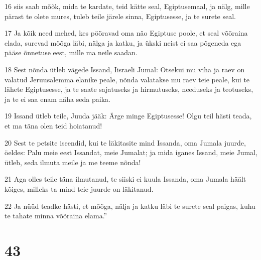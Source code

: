 \par 16 siis saab mõõk, mida te kardate, teid kätte seal, Egiptusemaal, ja nälg, mille pärast te olete mures, tuleb teile järele sinna, Egiptusesse, ja te surete seal.
\par 17 Ja kõik need mehed, kes pööravad oma näo Egiptuse poole, et seal võõraina elada, surevad mõõga läbi, nälga ja katku, ja ükski neist ei saa põgeneda ega pääse õnnetuse eest, mille ma neile saadan.
\par 18 Sest nõnda ütleb vägede Issand, Iisraeli Jumal: Otsekui mu viha ja raev on valatud Jeruusalemma elanike peale, nõnda valatakse mu raev teie peale, kui te lähete Egiptusesse, ja te saate sajatuseks ja hirmutuseks, needuseks ja teotuseks, ja te ei saa enam näha seda paika.
\par 19 Issand ütleb teile, Juuda jääk: Ärge minge Egiptusesse! Olgu teil hästi teada, et ma täna olen teid hoiatanud!
\par 20 Sest te petsite iseendid, kui te läkitasite mind Issanda, oma Jumala juurde, öeldes: Palu meie eest Issandat, meie Jumalat; ja mida iganes Issand, meie Jumal, ütleb, seda ilmuta meile ja me teeme nõnda!
\par 21 Aga olles teile täna ilmutanud, te siiski ei kuula Issanda, oma Jumala häält kõiges, milleks ta mind teie juurde on läkitanud.
\par 22 Ja nüüd teadke hästi, et mõõga, nälja ja katku läbi te surete seal paigas, kuhu te tahate minna võõraina elama.”

\chapter{43}

